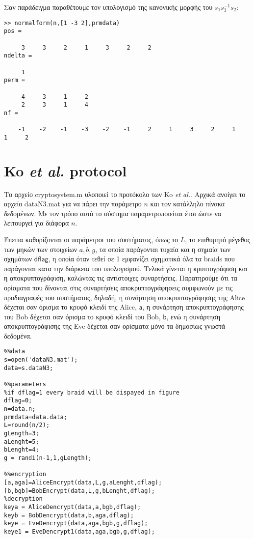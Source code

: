 \documentclass[a4paper,11pt]{article}
\newcommand\ntext[1]{\ensuremath{\mathsf{#1}}}
\begin{document}
Σαν παράδειγμα παραθέτουμε τον υπολογισμό της κανονικής μορφής του $ s_1s_3^{-1}s_2 $:
\begin{lstlisting}
>> normalform(n,[1 -3 2],prmdata)
pos =

     3     3     2     1     3     2     2
ndelta =

     1
perm =

     4     3     1     2
     2     3     1     4
nf =

    -1    -2    -1    -3    -2    -1     2     1     3     2     1     1     2
\end{lstlisting}

\section{Ko \textit{et al.} protocol}

Το αρχείο cryptosystem.m υλοποιεί το προτόκολο των Ko \textit{et al.}. Αρχικά ανοίγει το αρχείο dataN3.mat για να πάρει την παράμετρο $ n $ και τον κατάλληλο πίνακα δεδομένων. Με τον τρόπο αυτό το σύστημα παραμετροποιείται έτσι ώστε να λειτουργεί για διάφορα $ n $.

Έπειτα καθορίζονται οι παράμετροι του συστήματος, όπως το $ L $, το επιθυμητό μέγεθος των μηκών των στοιχείων $ a,b,g $, τα οποία παράγονται τυχαία και η σημαία των σχημάτων \ntext{dflag}, η οποία όταν τεθεί σε 1 εμφανίζει σχηματικά όλα τα braids που παράγονται κατα την διάρκεια του υπολογισμού. 
Τελικά γίνεται η κρυπτογράφιση και η αποκρυπτογράφιση, καλώντας τις αντίστοιχες συναρτήσεις. Παρατηρούμε ότι τα ορίσματα που δίνονται στις συναρτήσεις αποκρυπτογράφησεις συμφωνούν με τις προδιαγραφές του συστήματος, δηλαδή, η συνάρτηση αποκρυπτογράφησης της Alice δέχεται σαν όρισμα το κρυφό κλειδί της Alice, \ntext{a}, η συνάρτηση αποκρυπτογράφησης του Bob δέχεται σαν όρισμα το κρυφό κλειδί του Bob, \ntext{b}, ενώ η συνάρτηση αποκρυπτογράφισης της Eve δέχεται σαν ορίσματα μόνο τα δημοσίως γνωστά δεδομένα.  
\begin{lstlisting}
%%data
s=open('dataN3.mat');
data=s.dataN3;

%%parameters
%if dflag=1 every braid will be dispayed in figure
dflag=0;
n=data.n;
prmdata=data.data;
L=round(n/2);
gLength=3;
aLenght=5;
bLenght=4;
g = randi(n-1,1,gLength);

%%encryption
[a,aga]=AliceEncrypt(data,L,g,aLenght,dflag);
[b,bgb]=BobEncrypt(data,L,g,bLenght,dflag);
%decryption
keya = AliceDencrypt(data,a,bgb,dflag);
keyb = BobDencrypt(data,b,aga,dflag);
keye = EveDencrypt(data,aga,bgb,g,dflag);
keye1 = EveDencrypt1(data,aga,bgb,g,dflag);
\end{lstlisting}
\end{document}
